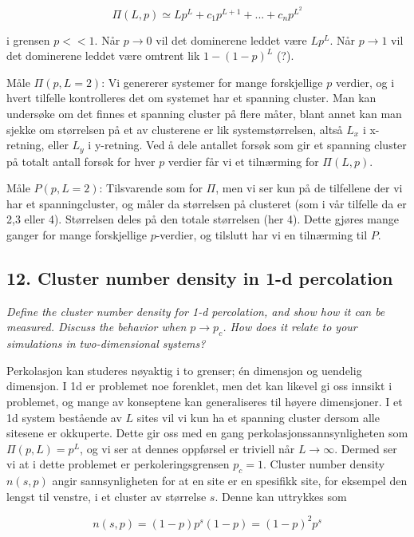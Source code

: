 \documentclass[a4paper,10pt]{article}
\begin{document}
\begin{equation}
 \Pi(L,p) \simeq Lp^L + c_1p^{L+1} + ... + c_np^{L^2}
\end{equation}

i grensen $p<<1$. Når $p\rightarrow0$ vil det dominerene leddet være $Lp^L$. Når $p\rightarrow1$ vil det dominerene leddet være omtrent lik $1-(1-p)^L$ (?).

Måle $\Pi(p,L=2)$: Vi genererer systemer for mange forskjellige $p$ verdier, og i hvert tilfelle kontrolleres det om systemet har et spanning cluster. Man kan undersøke om det finnes et spanning cluster på flere måter, blant annet kan man sjekke om størrelsen på et av clusterene er lik systemstørrelsen, altså $L_x$ i x-retning, eller $L_y$ i y-retning. Ved å dele antallet forsøk som gir et spanning cluster på totalt antall forsøk for hver $p$ verdier får vi et tilnærming for $\Pi(L,p)$.

Måle $P(p,L=2)$: Tilsvarende som for $\Pi$, men vi ser kun på de tilfellene der vi har et spanningcluster, og måler da størrelsen på clusteret (som i vår tilfelle da er 2,3 eller 4). Størrelsen deles på den totale størrelsen (her 4). Dette gjøres mange ganger for mange forskjellige $p$-verdier, og tilslutt har vi en tilnærming til $P$. 

\subsection*{12. Cluster number density in 1-d percolation}
\textit{Define the cluster number density for 1-d percolation, and show how it can
be measured. Discuss the behavior when $p \rightarrow p_c$. How does it relate to your
simulations in two-dimensional systems?}

Perkolasjon kan studeres nøyaktig i to grenser; én dimensjon og uendelig dimensjon. I 1d er problemet noe forenklet, men det kan likevel gi oss innsikt i problemet, og mange av konseptene kan generaliseres til høyere dimensjoner. 
I et 1d system bestående av $L$ sites vil vi kun ha et spanning cluster dersom alle sitesene er okkuperte. Dette gir oss med en gang perkolasjonssannsynligheten som $\Pi(p,L)=p^L$, og vi ser at dennes oppførsel er triviell når $L\rightarrow\infty$. Dermed ser vi at i dette problemet er perkoleringsgrensen $p_c = 1$.  
Cluster number density $n(s,p)$ angir sannsynligheten for at en site er en spesifikk site, for eksempel den lengst til venstre, i et cluster av størrelse $s$. Denne kan uttrykkes som

\begin{equation}
 n(s,p) = (1-p)p^s(1-p) = (1-p)^2p^s
\end{equation}
\end{document}
